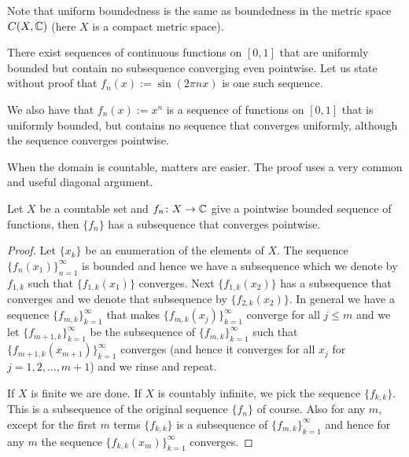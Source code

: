 Note that uniform boundedness is the same as boundedness in the metric space
$C(X,{\mathbb{C}})$ (here $X$ is a compact metric space).

\begin{example}
There exist sequences of 
continuous functions
on $[0,1]$ that are uniformly bounded but contain no subsequence converging
even pointwise.  Let us state without proof that $f_n(x) := \sin (2\pi n x)$ is one
such sequence.
\end{example}

\begin{example}
We also have that $f_n(x) := x^n$ is a sequence of functions on $[0,1]$
that is uniformly bounded, but contains no sequence that converges
uniformly,
although the sequence converges pointwise.
\end{example}

When the domain is countable, matters are easier.   The proof uses
a very common and useful diagonal argument.

\begin{thm} \label{thm:subsequenceoncountableX}
Let $X$ be a countable set and $f_n \colon X \to {\mathbb{C}}$ give a pointwise bounded
sequence of functions, then $\{ f_n \}$ has a subsequence that converges
pointwise.
\end{thm}

\begin{proof}
Let $\{ x_k \}$ be an enumeration of the elements of $X$.
The sequence $\{ f_n(x_1) \}_{n=1}^\infty$ is bounded and hence
we have a subsequence which we denote by
$f_{1,k}$ such that $\{ f_{1,k}(x_1) \}$ converges.
Next $\{ f_{1,k}(x_2) \}$ has a subsequence that converges and
we denote that subsequence by
$\{ f_{2,k}(x_2) \}$.  In general we have a sequence $\{ f_{m,k}
\}_{k=1}^\infty$
that makes $\{ f_{m,k}(x_j) \}_{k=1}^\infty$ converge for all $j \leq m$ and we 
let $\{ f_{m+1,k} \}_{k=1}^\infty$ be the subsequence of $\{ f_{m,k}
\}_{k=1}^\infty$
such that
$\{ f_{m+1,k}(x_{m+1}) \}_{k=1}^\infty$ converges (and hence it converges for all
$x_j$ for $j=1,2,\ldots,m+1$) and we rinse and repeat.

If $X$ is finite we are done.  If $X$ is countably infinite,
we pick the sequence
$\{ f_{k,k} \}$.  This is a subsequence of the original sequence $\{ f_n \}$
of course.  Also for any $m$,
except for the first $m$ terms $\{ f_{k,k} \}$ is a subsequence of $\{ f_{m,k}
\}_{k=1}^\infty$
and hence for any $m$ the sequence $\{ f_{k,k}(x_m) \}_{k=1}^\infty$ converges.
\end{proof}

